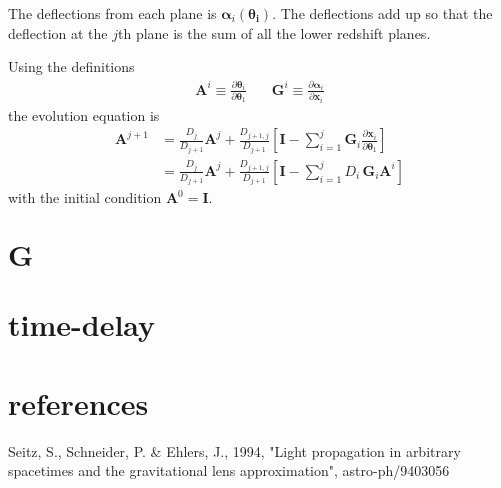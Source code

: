 \documentclass[12pt,a4paper]{article}
\begin{document}
The deflections from each plane is $\pmb{\alpha}_i(\pmb{\theta_i})$.  The deflections add up so that the deflection at the $j$th plane is the sum of all the lower redshift planes.


Using the definitions 
\begin{align}
\pmb{A}^i \equiv \frac{\partial \pmb{\theta}_i }{\partial \pmb{\theta}_1} ~~~~~~~~ \pmb{G}^i \equiv  \frac{\partial \pmb{\alpha}_i }{\partial \pmb{x}_i }
\end{align}
the evolution equation is
\begin{align}
\pmb{A}^{j+1} &=  \frac{D_j}{D_{j+1}} \pmb{A}^{j} + \frac{D_{j+1,j}}{D_{j+1}} \left[ \pmb{I} - \sum_{i=1}^{j} \pmb{G}_i \frac{\partial \pmb{x}_i}{\partial \pmb{\theta}_1} \right] \\
&=   \frac{D_j}{D_{j+1}} \pmb{A}^{j}+ \frac{D_{j+1,j}}{D_{j+1}} \left[ \pmb{I} -  \sum_{i=1}^{j} D_i \,\pmb{G}_i \pmb{A}^i \right]
\end{align}
with the initial condition $\pmb{A}^{0} = \pmb{I}$.

\section{$\pmb{G}$}



\section{time-delay}
\section{references}

Seitz, S., Schneider, P. \& Ehlers, J., 1994, "Light propagation in arbitrary spacetimes and the gravitational lens approximation", astro-ph/9403056
\end{document}
